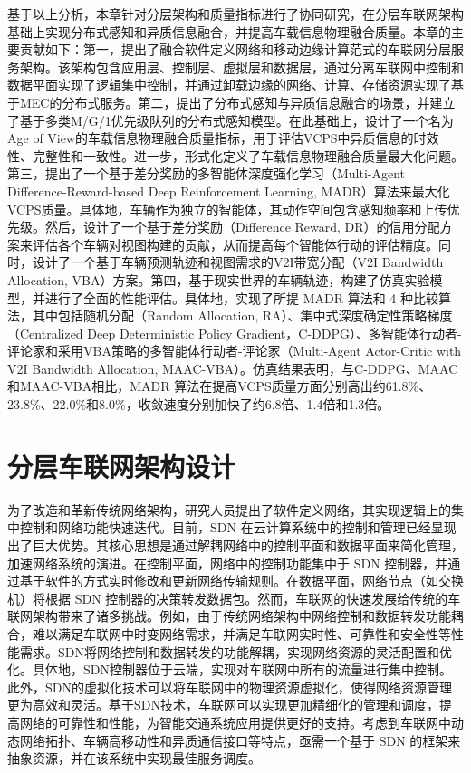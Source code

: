 基于以上分析，本章针对分层架构和质量指标进行了协同研究，在分层车联网架构基础上实现分布式感知和异质信息融合，并提高车载信息物理融合质量。本章的主要贡献如下：第一，提出了融合软件定义网络和移动边缘计算范式的车联网分层服务架构。该架构包含应用层、控制层、虚拟层和数据层，通过分离车联网中控制和数据平面实现了逻辑集中控制，并通过卸载边缘的网络、计算、存储资源实现了基于MEC的分布式服务。第二，提出了分布式感知与异质信息融合的场景，并建立了基于多类M/G/1优先级队列的分布式感知模型。在此基础上，设计了一个名为Age of View的车载信息物理融合质量指标，用于评估VCPS中异质信息的时效性、完整性和一致性。进一步，形式化定义了车载信息物理融合质量最大化问题。第三，提出了一个基于差分奖励的多智能体深度强化学习（Multi-Agent Difference-Reward-based Deep Reinforcement Learning, MADR）算法来最大化VCPS质量。具体地，车辆作为独立的智能体，其动作空间包含感知频率和上传优先级。然后，设计了一个基于差分奖励（Difference Reward, DR）的信用分配方案来评估各个车辆对视图构建的贡献，从而提高每个智能体行动的评估精度。同时，设计了一个基于车辆预测轨迹和视图需求的V2I带宽分配（V2I Bandwidth Allocation, VBA）方案。第四，基于现实世界的车辆轨迹，构建了仿真实验模型，并进行了全面的性能评估。具体地，实现了所提 MADR 算法和 4 种比较算法，其中包括随机分配（Random Allocation, RA）、集中式深度确定性策略梯度（Centralized Deep Deterministic Policy Gradient，C-DDPG）\cite{mlika2022deep}、多智能体行动者-评论家\cite{he2021efficient}和采用VBA策略的多智能体行动者-评论家（Multi-Agent Actor-Critic with V2I Bandwidth Allocation, MAAC-VBA）。仿真结果表明，与C-DDPG、MAAC和MAAC-VBA相比，MADR 算法在提高VCPS质量方面分别高出约61.8\%、23.8\%、22.0\%和8.0\%，收敛速度分别加快了约6.8倍、1.4倍和1.3倍。

\section{分层车联网架构设计}\label{section 2-2}

为了改造和革新传统网络架构，研究人员提出了软件定义网络\cite{wang2020ji}，其实现逻辑上的集中控制和网络功能快速迭代。目前，SDN 在云计算系统中的控制和管理已经显现出了巨大优势\cite{jain2013network}。其核心思想是通过解耦网络中的控制平面和数据平面来简化管理，加速网络系统的演进。在控制平面，网络中的控制功能集中于 SDN 控制器，并通过基于软件的方式实时修改和更新网络传输规则。在数据平面，网络节点（如交换机）将根据 SDN 控制器的决策转发数据包。然而，车联网的快速发展给传统的车联网架构带来了诸多挑战。例如，由于传统网络架构中网络控制和数据转发功能耦合，难以满足车联网中时变网络需求，并满足车联网实时性、可靠性和安全性等性能需求。SDN将网络控制和数据转发的功能解耦，实现网络资源的灵活配置和优化。具体地，SDN控制器位于云端，实现对车联网中所有的流量进行集中控制。此外，SDN的虚拟化技术可以将车联网中的物理资源虚拟化，使得网络资源管理更为高效和灵活。基于SDN技术，车联网可以实现更加精细化的管理和调度，提高网络的可靠性和性能，为智能交通系统应用提供更好的支持。考虑到车联网中动态网络拓扑、车辆高移动性和异质通信接口等特点，亟需一个基于 SDN 的框架来抽象资源，并在该系统中实现最佳服务调度。

